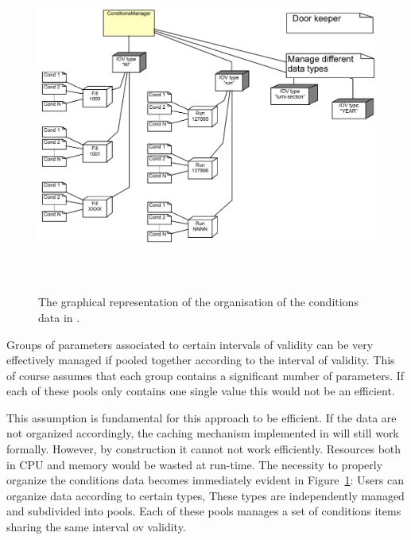 \documentclass[10pt,a4paper]{article}
\begin{document}
\begin{figure}[t]
  \begin{center}\includegraphics[height=11cm] {DDCond-ConditionsStore.png}
    \caption{The graphical representation of the organisation of the
             conditions data in \DDH. }
    \label{fig:ddcond-data-organization}
  \end{center}
\end{figure}

\noindent
Groups of parameters associated to certain intervals of validity can
be very effectively managed if pooled together according to the 
interval of validity. This of course assumes that each group contains
a significant number of parameters. If each of these pools only contains
one single value this would not be an efficient.

\noindent
This assumption is fundamental for this approach to be efficient. 
If the data are not
organized accordingly, the caching mechanism implemented in \DDC will 
still work formally. However, by construction it cannot not work efficiently. 
Resources both in CPU and memory would be wasted at run-time.
The necessity to properly organize the conditions data becomes
immediately evident in Figure~\ref{fig:ddcond-data-organization}:
Users can organize data according to certain types, These types are
independently managed and subdivided into pools. Each of these pools
manages a set of conditions items sharing the same interval ov validity.
\end{document}
